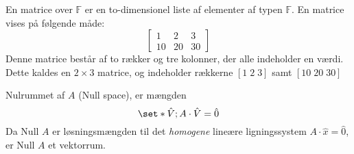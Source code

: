 En matrice over $\mathbb{F}$ er en to-dimensionel liste af elementer af typen $\mathbb{F}$. En matrice vises på følgende måde:
$$\left[
\begin{matrix}
    1&2&3\\
    10&20&30
\end{matrix}
\right]
$$
Denne matrice består af to rækker og tre kolonner, der alle indeholder en værdi. Dette kaldes en $2 \times 3$ matrice, og indeholder rækkerne $[1\;2\;3]$ samt $[10\;20\;30]$

\begin{frdef}
    Nulrummet af $A$ (Null space), er mængden
    $$\set*{\hat{V}; A\cdot \hat{V}=\hat{0}}$$
    Da Null $A$ er løsningsmængden til det \emph{homogene} lineære ligningssystem $A\cdot\hat{x}=\hat{0}$, er Null $A$ et vektorrum.
\end{frdef}